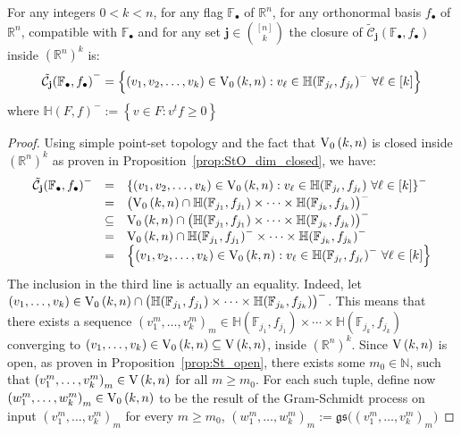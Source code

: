 \begin{lemma}\label{lem:closure_of_cells} For any integers $0<k<n$, for any flag $\mathbb{F}_{\bullet}$ of $\mathbb{R}^n$, for any orthonormal basis $f_{\bullet}$ of $\mathbb{R}^n$, compatible with $\mathbb{F}_{\bullet}$ and for any set $\mathbf{j}\in\binom{[n]}{k}$ the closure of $\tilde{\mathcal{C}}_{\mathbf{j}}{\left(\mathbb{F}_{\bullet},f_{\bullet}\right)}$ inside ${\left(\mathbb{R}^n\right)}^k$ is:
\[{\tilde{\mathcal{C}}_{\mathbf{j}}{\left(\mathbb{F}_{\bullet},f_{\bullet}\right)}}^-=\left\{(v_1,v_2,\ldots,v_k)\in\StO{k}{n}:v_{\ell}\in{\mathbb{H}(\mathbb{F}_{j_{\ell}},f_{j_{\ell}})}^-\ \forall\ell\in[k]\right\}\]
where
${\mathbb{H}(F,f)}^-:=\left\{v\in F:v^tf\geq 0\right\}$
\end{lemma}
\begin{proof} Using simple point-set topology and the fact that $\StO{k}{n}$ is closed inside ${\left(\mathbb{R}^n\right)}^k$ as proven in Proposition~\ref{prop:StO_dim_closed}, we have:
\[\begin{array}{rcl}\tilde{\mathcal{C}}_{\mathbf{j}}{\left(\mathbb{F}_{\bullet},f_{\bullet}\right)}^-
&=&{\left\{(v_1,v_2,\ldots,v_k)\in\StO{k}{n}:v_{\ell}\in\mathbb{H}(\mathbb{F}_{j_{\ell}},f_{j_{\ell}})\ \forall\ell\in[k]\right\}}^-\\
&=&{\big(\StO{k}{n}\cap\mathbb{H}(\mathbb{F}_{j_1},f_{j_1})\times\cdots\times\mathbb{H}(\mathbb{F}_{j_k},f_{j_k})\big)}^-\\
&\subseteq&\StO{k}{n}\cap{\big(\mathbb{H}(\mathbb{F}_{j_1},f_{j_1})\times\cdots\times\mathbb{H}(\mathbb{F}_{j_k},f_{j_k})\big)}^-\\
&=&\StO{k}{n}\cap\mathbb{H}{\left(\mathbb{F}_{j_1},f_{j_1}\right)}^-\times\cdots\times\mathbb{H}{\left(\mathbb{F}_{j_k},f_{j_k}\right)}^-\\
&=&\left\{(v_1,v_2,\ldots,v_k)\in\StO{k}{n}:v_{\ell}\in{\mathbb{H}(\mathbb{F}_{j_{\ell}},f_{j_{\ell}})}^-\ \forall\ell\in[k]\right\}\\
\end{array}\]
The inclusion in the third line is actually an equality. Indeed, let $(v_1,\ldots,v_k)\in\StO{k}{n}\cap{\big(\mathbb{H}(\mathbb{F}_{j_1},f_{j_1})\times\cdots\times\mathbb{H}(\mathbb{F}_{j_k},f_{j_k})\big)}^-$. This means that there exists a sequence ${(v_1^m,\ldots,v_k^m)}_m\in\mathbb{H}(\mathbb{F}_{j_1},f_{j_1})\times\cdots\times\mathbb{H}(\mathbb{F}_{j_k},f_{j_k})$ converging to $(v_1,\ldots,v_k)\in\StO{k}{n}\subseteq\St{k}{n}$, inside ${\left(\mathbb{R}^n\right)}^k$. Since $\St{k}{n}$ is open, as proven in Proposition~\ref{prop:St_open}, there exists some $m_0\in\mathbb{N}$, such that ${(v_1^m,\ldots,v_k^m)}_m\in\St{k}{n}$ for all $m\geq m_0$. For each such tuple, define now ${(w_1^m,\ldots,w_k^m)}_m\in\StO{k}{n}$ to be the result of the Gram-Schmidt process on input ${(v_1^m,\ldots,v_k^m)}_m$ for every $m\geq m_0$,
${(w_1^m,\ldots,w_k^m)}_m:=\mathfrak{gs}\big({(v_1^m,\ldots,v_k^m)}_m\big)$


\end{proof}
